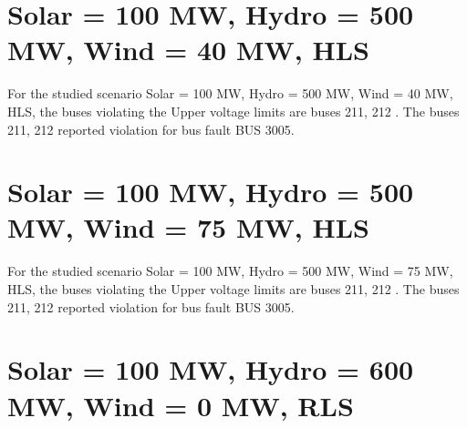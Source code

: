 \documentclass[10pt]{report}
\begin{document}
\section{Solar = 100 MW, Hydro = 500 MW, Wind = 40 MW, HLS}

For the studied scenario Solar = 100 MW, Hydro = 500 MW, Wind = 40 MW, HLS, the buses violating the Upper voltage limits are buses 211, 212 .
The buses 211, 212 reported violation for bus fault BUS 3005.
\begin{table}[H]
\caption{Contingencies reporting bus voltages greater than emergency voltage of 1.1 PU for scenario Solar = 100 MW, Hydro = 500 MW, Wind = 40 MW, HLS}
\label{HVSolar100MWHydro500MWWind40MWHLS}
\centering
{}
\end{table}

\section{Solar = 100 MW, Hydro = 500 MW, Wind = 75 MW, HLS}

For the studied scenario Solar = 100 MW, Hydro = 500 MW, Wind = 75 MW, HLS, the buses violating the Upper voltage limits are buses 211, 212 .
The buses 211, 212 reported violation for bus fault BUS 3005.
\begin{table}[H]
\caption{Contingencies reporting bus voltages greater than emergency voltage of 1.1 PU for scenario Solar = 100 MW, Hydro = 500 MW, Wind = 75 MW, HLS}
\label{HVSolar100MWHydro500MWWind75MWHLS}
\centering
{}
\end{table}

\section{Solar = 100 MW, Hydro = 600 MW, Wind = 0 MW, RLS}
\end{document}
